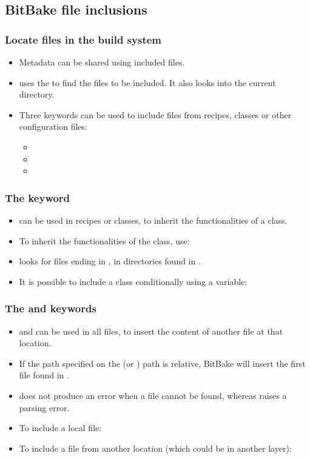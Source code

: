 \subsection{BitBake file inclusions}

\begin{frame}
  \frametitle{Locate files in the build system}
  \begin{itemize}
    \item Metadata can be shared using included files.
    \item {} uses the  to find the files to
      be included. It also looks into the current directory.
    \item Three keywords can be used to include files from recipes,
      classes or other configuration files:
      \begin{itemize}
        \item {}
        \item {}
        \item {}
      \end{itemize}
  \end{itemize}
\end{frame}

\begin{frame}
  \frametitle{The  keyword}
  \begin{itemize}
    \item {} can be used in recipes or classes, to inherit
      the functionalities of a class.
    \item To inherit the functionalities of the  class,
      use: 
    \item {} looks for files ending in , in
       directories found in .
    \item It is possible to include a class conditionally using a
      variable: 
  \end{itemize}
\end{frame}

\begin{frame}
  \frametitle{The  and  keywords}
  \begin{itemize}
    \item {} and  can be used in all files,
      to insert the content of another file at that location.
    \item If the path specified on the  (or
      ) path is relative, BitBake will insert the first
      file found in .
    \item {} does not produce an error when a file cannot
      be found, whereas  raises a parsing error.
    \item To include a local file: 
    \item To include a file from another location (which could be
      in another layer): 
  \end{itemize}
\end{frame}

